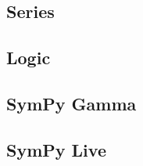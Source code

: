\subsection{Series}



\subsection{Logic}


\subsection{SymPy Gamma}\label{sympy-gamma}



\subsection{SymPy Live}\label{sympy-live}


